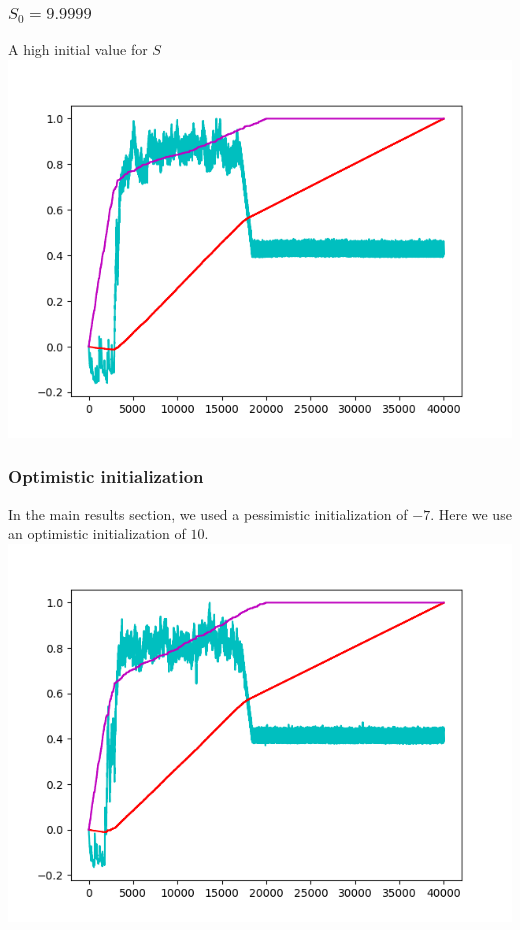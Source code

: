 \documentclass{article}
\begin{document}
\subsubsection{$S_0 = 9.9999$}
A high initial value for $S$\\
\includegraphics{borgies_inits99999.png}

\subsubsection{Optimistic initialization}
In the main results section, we used a pessimistic initialization of $-7$. Here
we use an optimistic initialization of $10$.\\ 
\includegraphics{borgies_optimism1000000.png}
\end{document}
